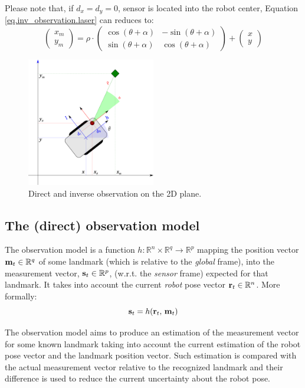 		Please note that, if $d_x = d_y = 0$, \ie{} sensor is located into the robot center, Equation \ref{eq.inv_observation.laser} can reduces to:
		\[
			\left(\begin{array}{c}
				x_m \\ y_m
			\end{array}\right)
			=
			\rho \cdot
			\left(\begin{array}{ccc}
				\cos{(\theta + \alpha)} & -\sin{(\theta + \alpha)} \\
				\sin{(\theta + \alpha)} & \cos{(\theta + \alpha)}
			\end{array}\right)
			+
			\left(\begin{array}{c}
				x \\ y
			\end{array}\right)
		\]
		
		\begin{figure}
			\centering
			\includegraphics[width=0.5\textwidth]{./img/observation.pdf}
			\caption{Direct and inverse observation on the 2D plane.}
			\label{fig.observation}
		\end{figure}
		
\subsection{The (direct) observation model}
	The observation model is a function $h : \mathbb{R}^n \times \mathbb{R}^q \rightarrow \mathbb{R}^p$ mapping the position vector $\boldsymbol{\mathrm{{m}}}_t \in \mathbb{R}^q$ of some landmark (which is relative to the \emph{global} frame), into the measurement vector, $\boldsymbol{\mathrm{{s}}}_{t} \in \mathbb{R}^p$, (w.r.t. the \emph{sensor} frame) expected for that landmark. 
	It takes into account the current \emph{robot} pose vector $\boldsymbol{\mathrm{{r}}}_t \in \mathbb{R}^n$.
	More formally:
	\[
		\boldsymbol{\mathrm{{s}}}_t = h(\boldsymbol{\mathrm{{r}}}_{t},\, \boldsymbol{\mathrm{{m}}}_t)
	\]
	
	The observation model aims to produce an estimation of the measurement vector for some known landmark taking into account the current estimation of the robot pose vector and the landmark position vector. 
	Such estimation is compared with the actual measurement vector relative to the recognized landmark and their difference is used to reduce the current uncertainty about the robot pose. 
	
